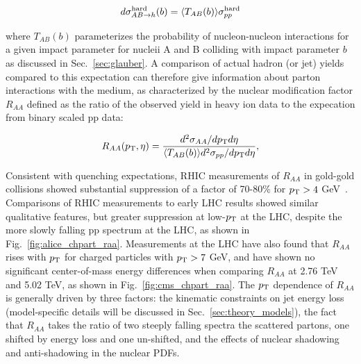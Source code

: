 \begin{equation}
\label{eq:raa_p0}
d \sigma_{AB\rightarrow h}^{\rm hard}(b) = \langle T_{AB}(b) \rangle \sigma_{pp}^{\rm hard}
\end{equation}

\noindent where $T_{AB}(b)$ parameterizes the probability of nucleon-nucleon interactions for a given impact parameter for nucleii A and B colliding with impact parameter $b$ as discussed in Sec.~\ref{sec:glauber}.  A comparison of actual hadron (or jet) yields compared to this expectation can therefore give information about parton interactions with the medium, as characterized by the nuclear modification factor $R_{AA}$ defined as the ratio of the observed yield in heavy ion data to the expecation from binary scaled pp data: 

\begin{equation}
\label{eq:raa_trk}
R_{AA}(p_{\rm T}, \eta) = \frac{d^{2}\sigma_{AA}/dp_{\rm T} d\eta}{\langle T_{AB}(b) \rangle  d^{2}\sigma_{pp}/dp_{\rm T} d\eta},
\end{equation}

Consistent with quenching expectations, RHIC measurements of $R_{AA}$ in gold-gold collisions showed substantial suppression of a factor of 70-80\% for $p_{\rm T} > 4$ GeV~\cite{Arsene:2004fa, Adcox:2004mh, Back:2004je, Adams:2005dq}.  Comparisons of RHIC measurements to early LHC results showed similar qualitative features, but greater suppression at low-$p_{\rm T}$ at the LHC, despite the more slowly falling pp spectrum at the LHC, as shown in Fig.~\ref{fig:alice_chpart_raa}.  Measurements at the LHC have also found that $R_{AA}$ rises with $p_{\rm T}$ for charged particles with $p_{\rm T} > 7$ GeV, and have shown no significant center-of-mass energy differences when comparing $R_{AA}$ at 2.76 TeV and 5.02 TeV, as shown in Fig.~\ref{fig:cms_chpart_raa}.  The $p_{\rm T}$ dependence of $R_{AA}$ is generally driven by three factors:  the kinematic constraints on jet energy loss (model-specific details will be discussed in Sec.~\ref{sec:theory_models}), the fact that $R_{AA}$ takes the ratio of two steeply falling spectra the scattered partons, one shifted by energy loss and one un-shifted, and the effects of nuclear shadowing and anti-shadowing in the nuclear PDFs.~\cite{d'Enterria:2009am, Armesto:2006ph}

